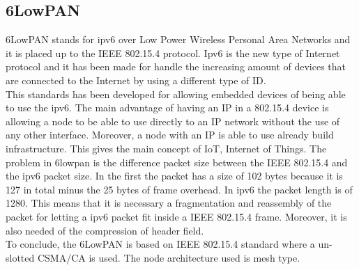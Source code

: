 \subsection{6LowPAN}
6LowPAN stands for ipv6 over Low Power Wireless Personal Area Networks and it is placed up to the IEEE 802.15.4 protocol. Ipv6 is the new type of Internet protocol and it has been made for handle the increasing amount of devices that are connected to the Internet by using a different type of ID.\cite{6lowpan}\\
This standards has been developed for allowing embedded devices of being able to use the ipv6.\cite{why}
The main advantage of having an IP in a 802.15.4 device is allowing a node to be able to use directly to an IP network without the use of any other interface. Moreover, a node with an IP is able to use already build infrastructure.\cite{6lowpan} This gives the main concept of IoT, Internet of Things. 
The problem in 6lowpan is the difference packet size between the IEEE 802.15.4 and the ipv6 packet size. In the first the packet has a size of 102 bytes because it is 127 in total minus the 25 bytes of frame overhead. In ipv6 the packet length is of 1280. This means that it is necessary a fragmentation and reassembly of the packet for letting a ipv6 packet fit inside a IEEE 802.15.4 frame. Moreover, it is also needed of the compression of header field.\cite{slide} \cite{6lowpan}\\
To conclude, the 6LowPAN is based on IEEE 802.15.4 standard where a un-slotted CSMA/CA is used. The node architecture used is mesh type. \cite{6lowpan}\\
